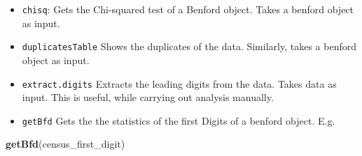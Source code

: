 \documentclass[
]{book}
\newenvironment{Shaded}{\begin{snugshade}}{\end{snugshade}}
\newcommand{\FunctionTok}[1]{\textcolor[rgb]{0.13,0.29,0.53}{\textbf{#1}}}
\newcommand{\NormalTok}[1]{#1}
\providecommand{\tightlist}{%
  \setlength{\itemsep}{0pt}\setlength{\parskip}{0pt}}
\begin{document}
\begin{itemize}
\tightlist
\item
  \texttt{chisq}: Gets the Chi-squared test of a Benford object. Takes a benford object as input.
\item
  \texttt{duplicatesTable} Shows the duplicates of the data. Similarly, takes a benford object as input.
\item
  \texttt{extract.digits} Extracts the leading digits from the data. Takes data as input. This is useful, while carrying out analysis manually.
\item
  \texttt{getBfd} Gets the the statistics of the first Digits of a benford object. E.g.
\end{itemize}

\begin{Shaded}
\begin{Highlighting}[]
\FunctionTok{getBfd}\NormalTok{(census\_first\_digit)}
\end{Highlighting}
\end{Shaded}
\end{document}
